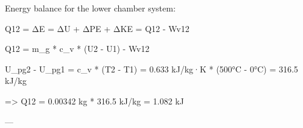 Energy balance for the lower chamber system:  

Q12 = ΔE = ΔU + ΔPE + ΔKE = Q12 - Wv12  

Q12 = m_g * c_v * (U2 - U1) - Wv12  

U_pg2 - U_pg1 = c_v * (T2 - T1) = 0.633 kJ/kg·K * (500°C - 0°C) = 316.5 kJ/kg  

=> Q12 = 0.00342 kg * 316.5 kJ/kg = 1.082 kJ  

---